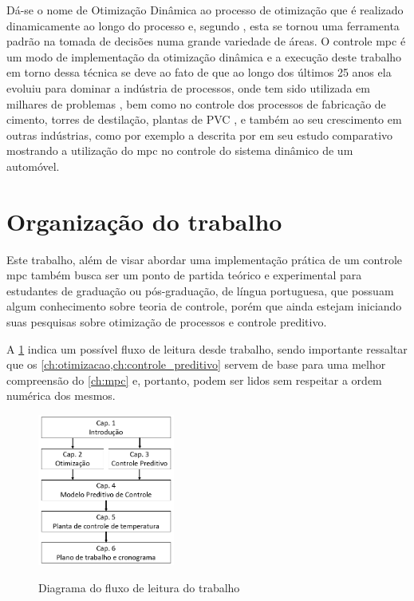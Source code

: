 Dá-se o nome de Otimização Dinâmica ao processo de otimização que é realizado
dinamicamente ao longo do processo e, segundo , esta se
tornou uma ferramenta padrão na tomada de decisões numa grande variedade de áreas.
O controle \acrshort{mpc} é um modo de implementação da otimização dinâmica e a execução
deste trabalho em torno dessa técnica se deve ao fato de que ao longo dos últimos 25 anos
ela evoluiu para dominar a indústria de processos, onde tem sido utilizada em milhares
de problemas \cite{Borrelli2017}, bem como no controle dos processos de fabricação de cimento,
torres de destilação, plantas de PVC \cite{Camacho2007}, e também ao seu crescimento em outras
indústrias, como por exemplo a descrita por  em seu estudo comparativo
mostrando a utilização do \acrshort{mpc} no controle do sistema dinâmico de um automóvel.

\section{Organização do trabalho}
\label{sec:organizacao_do_trabalho}

Este trabalho, além de visar abordar uma implementação prática de um controle \acrshort{mpc}
também busca ser um ponto de partida teórico e experimental para estudantes de graduação ou
pós-graduação, de língua portuguesa, que possuam algum conhecimento sobre teoria de controle,
porém que ainda estejam iniciando suas pesquisas sobre otimização de processos e controle preditivo.

A \cref{fig:estrutura_do_trabalho} indica um possível fluxo de leitura desde trabalho, sendo importante
ressaltar que os \cref{ch:otimizacao,ch:controle_preditivo} servem de base para uma melhor
compreensão do \cref{ch:mpc} e, portanto, podem ser lidos sem respeitar a ordem numérica dos mesmos.

\begin{figure}[h]
    \caption{Diagrama do fluxo de leitura do trabalho}
    \begin{center}
		\includegraphics[width=0.4\textwidth]{./5_images/fig_estrutura_do_trabalho.png} 
		\label{fig:estrutura_do_trabalho}
    \end{center}
    \centering
\end{figure}